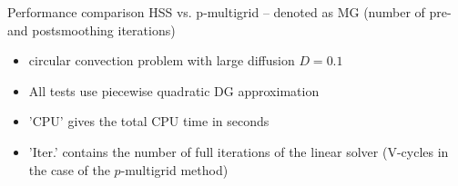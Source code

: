 \documentclass[mathserif]{beamer}
\begin{document}
\begin{frame}

{\large Performance comparison HSS vs. p-multigrid -- denoted as MG (number of pre- and postsmoothing iterations)}
\begin{itemize}
\item circular convection problem with large diffusion $D=0.1$
\item \vspace{-2mm}All tests use piecewise quadratic DG approximation
\item \vspace{-2mm}'CPU' gives the total CPU time in seconds
\item \vspace{-2mm}'Iter.' contains the number of full iterations of the linear solver (V-cycles in the case of the $p$-multigrid method)
\end{itemize}


\end{frame}
\end{document}
